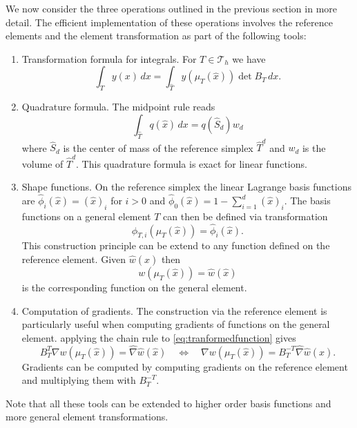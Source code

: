 \documentclass[a4paper,12pt]{article}
\begin{document}
We now consider the three operations outlined in the previous section
in more detail. The efficient implementation of these operations involves
the reference elements and the element transformation as part of the following
tools:
\begin{enumerate}[Tool 1)]
\item Transformation formula for integrals. For $T\in\mathcal{T}_h$ we have
\begin{equation*}
\int_T y(x)\,dx = \int_{\hat T} y(\mu_T(\hat x)) \det B_T \,dx .
\end{equation*}
\item Quadrature formula. The midpoint rule reads
\begin{equation*}
\int_{\hat T} q(\hat x) \,dx = q(\hat S_d) w_d
\end{equation*}
where $\hat S_d$ is the center of mass of the reference simplex $\hat T^d$
and $w_d$ is the volume of $\hat T^d$. This quadrature formula is exact for linear
functions.
\item Shape functions. On the reference simplex the linear Lagrange
basis functions are $\hat\phi_i(\hat x) = (\hat x)_i$ for $i>0$ and 
$\hat\phi_0(\hat x) = 1-\sum_{i=1}^d (\hat x)_i$. The basis functions
on a general element $T$ can then be defined via transformation
\begin{equation*}
\phi_{T,i}(\mu_T(\hat x)) = \hat\phi_i(\hat x) .
\end{equation*}
This construction principle can be extend to any function defined on the
reference element. Given $\hat w(\hat x)$ then 
\begin{equation}
w(\mu_T(\hat x))=\hat w(\hat x)
\label{eq:tranformedfunction}
\end{equation}
is the corresponding function on the general element.
\item Computation of gradients. The construction via the reference element
is particularly useful when computing gradients of functions on the general element.
applying the chain rule to \eqref{eq:tranformedfunction} gives
\begin{equation*}
B_T^T \nabla w(\mu_T(\hat x)) = \hat\nabla \hat w(\hat x) \quad\Leftrightarrow\quad
\nabla w(\mu_T(\hat x)) = B_T^{-T}\hat\nabla \hat w(\hat x) .
\end{equation*}
Gradients can be computed by computing gradients on the reference element
and multiplying them with $B_T^{-T}$.
\end{enumerate}
Note that all these tools can be extended to higher order basis functions
and more general element transformations.
\end{document}
